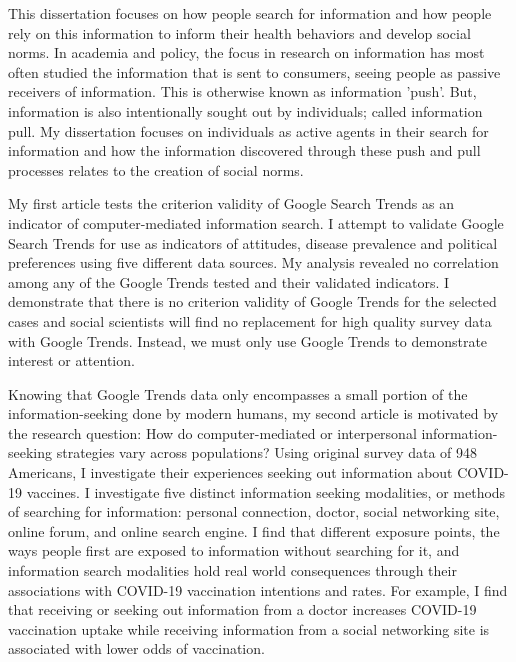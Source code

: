 
This dissertation focuses on how people search for information and how people
rely on this information to inform their health behaviors and develop social
norms. In academia and policy, the focus in research on information has most
often studied the information that is sent to consumers, seeing people as
passive receivers of information. This is otherwise known as information 'push'.
But, information is also intentionally sought out by individuals; called
information pull. My dissertation focuses on individuals as active agents in
their search for information and how the information discovered through these
push and pull processes relates to the creation of social norms.

My first article tests the criterion validity of Google Search Trends as an
indicator of computer-mediated information search. I attempt to validate Google
Search Trends for use as indicators of attitudes, disease prevalence and
political preferences using five different data sources. My analysis revealed no
correlation among any of the Google Trends tested and their validated
indicators. I demonstrate that there is no criterion validity of Google Trends
for the selected cases and social scientists will find no replacement for high
quality survey data with Google Trends. Instead, we must only use Google Trends
to demonstrate interest or attention.

Knowing that Google Trends data only encompasses a small portion of the
information-seeking done by modern humans, my second article is motivated by the
research question: How do computer-mediated or interpersonal information-seeking
strategies vary across populations? Using original survey data of 948 Americans,
I investigate their experiences seeking out information about COVID-19 vaccines.
I investigate five distinct information seeking modalities, or methods of
searching for information: personal connection, doctor, social networking site,
online forum, and online search engine. 
I find that different exposure points, the ways people first are exposed
to information without searching for it, and information search modalities hold
real world consequences through their associations with COVID-19 vaccination
intentions and rates. For example, I find that receiving or seeking out
information from a doctor increases COVID-19 vaccination uptake while receiving
information from a social networking site is associated with lower odds of
vaccination.

